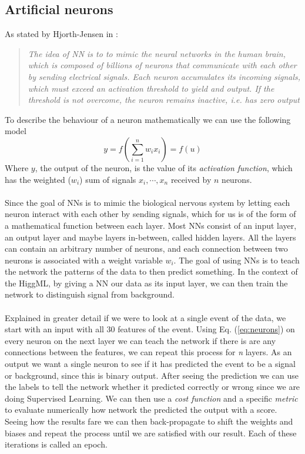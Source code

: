 \documentclass[14pt, a4paper]{book}
\begin{document}
\subsection{Artificial neurons}
As stated by Hjorth-Jensen in \cite{MORTYY1}:
\begin{quote}
    \textit{The idea of NN is to to mimic the neural networks in the human brain, which is composed of billions of neurons that communicate with each other by sending electrical signals. Each neuron accumulates its incoming signals, which must exceed an activation threshold to yield and output. If the threshold is not overcome, the neuron remains inactive, i.e. has zero output}
\end{quote}
To describe the behaviour of a neuron mathematically we can use the following model
\begin{equation}\label{eq:neurons}
    y=f\left(\sum_{i=1}^{n}w_ix_i\right)=f(u)
\end{equation}
Where $y$, the output of the neuron, is the value of its \textit{activation function}, which has the weighted ($w_i$) sum of signals $x_i,\cdots,x_n$ received by $n$ neurons.\\
\\Since the goal of NNs is to mimic the biological nervous system by letting each neuron interact with each other by sending signals, which for us is of the form of a mathematical function between each layer. Most NNs consist of an input layer, an output layer and maybe layers in-between, called hidden layers. All the layers can contain an arbitrary number of neurons, and each connection between two neurons is associated with a weight variable $w_i$. The goal of using NNs is to teach the network the patterns of the data to then predict something. In the context of the HiggML, by giving a NN our data as its input layer, we can then train the network to distinguish signal from background.\\ \\Explained in greater detail if we were to look at a single event of the data, we start with an input with all 30 features of the event. Using Eq. (\ref{eq:neurons}) on every neuron on the next layer we can teach the network if there is are any connections between the features, we can repeat this process for \textit{n} layers. As an output we want a single neuron to see if it has predicted the event to be a signal or background, since this is binary output. After seeing the prediction we can use the labels to tell the network whether it predicted correctly or wrong since we are doing Supervised Learning. We can then use a \textit{cost function} and a specific \textit{metric} to evaluate numerically how network the predicted the output with a score. Seeing how the results fare we can then back-propagate to shift the weights and biases and repeat the process until we are satisfied with our result. Each of these iterations is called an epoch.\\
\end{document}
